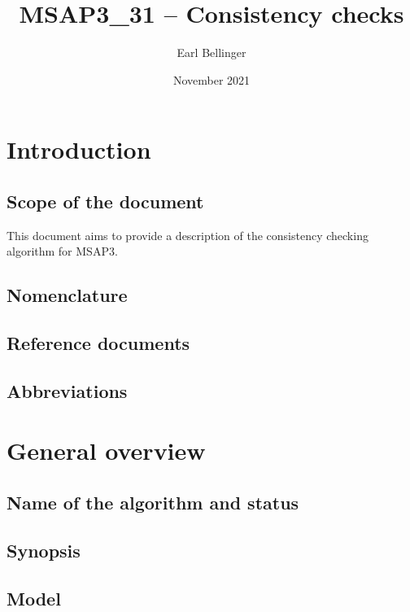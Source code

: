 \documentclass{article}
\title{MSAP3\_31 – Consistency checks}
\author{Earl Bellinger}
\date{November 2021}
\begin{document}
\maketitle

\newpage
\tableofcontents 
\newpage

\section{Introduction}
\subsection{Scope of the document}
This document aims to provide a description of the consistency checking algorithm for MSAP3. 

\subsection{Nomenclature}
\subsection{Reference documents}
\subsection{Abbreviations}

\section{General overview}
\subsection{Name of the algorithm and status}


\subsection{Synopsis}
\subsection{Model}
\end{document}
